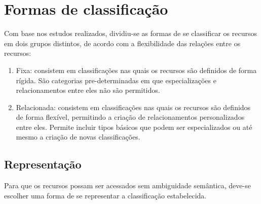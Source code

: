 \section{Formas de classificação}

Com base nos estudos realizados, dividiu-se as formas de se classificar os recursos em dois grupos distintos, de acordo com a flexibilidade das relações entre os recursos:

\begin{enumerate}
	\item Fixa: consistem em classificações nas quais os recursos são definidos de forma rígida. São categorias pre-determinadas em que especializações e relacionamentos entre eles não são permitidos.

	\item Relacionada: consistem em classificações nas quais os recursos são definidos de forma flexível, permitindo a criação de relacionamentos personalizados entre eles. Permite incluir tipos básicos que podem ser especializados ou até mesmo a criação de novas classificações.
\end{enumerate}

\subsection{Representação}

Para que os recursos possam ser acessados sem ambiguidade semântica, deve-se escolher uma forma de se representar a classificação estabelecida.

